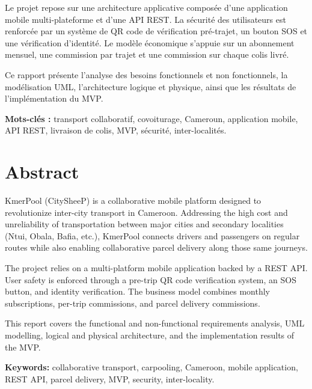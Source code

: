 \documentclass[12pt, a4paper]{report}
\begin{document}
Le projet repose sur une architecture applicative composée d'une application mobile
multi-plateforme et d'une \ac{API} \ac{REST}. La sécurité des utilisateurs est renforcée
par un système de \ac{QR} code de vérification pré-trajet, un bouton \ac{SOS} et une
vérification d'identité. Le modèle économique s'appuie sur un abonnement mensuel,
une commission par trajet et une commission sur chaque colis livré.

Ce rapport présente l'analyse des besoins fonctionnels et non fonctionnels, la
modélisation \ac{UML}, l'architecture logique et physique, ainsi que les résultats de
l'implémentation du \ac{MVP}.

\bigskip
\noindent\textbf{Mots-clés :} transport collaboratif, covoiturage, Cameroun, application mobile,
\ac{API} \ac{REST}, livraison de colis, \ac{MVP}, sécurité, inter-localités.

\chapter*{Abstract}

KmerPool (CitySheeP) is a collaborative mobile platform designed to revolutionize
inter-city transport in Cameroon. Addressing the high cost and unreliability of
transportation between major cities and secondary localities (Ntui, Obala, Bafia, etc.),
KmerPool connects drivers and passengers on regular routes while also enabling
collaborative parcel delivery along those same journeys.

The project relies on a multi-platform mobile application backed by a REST API.
User safety is enforced through a pre-trip QR code verification system, an SOS button,
and identity verification. The business model combines monthly subscriptions,
per-trip commissions, and parcel delivery commissions.

This report covers the functional and non-functional requirements analysis, UML
modelling, logical and physical architecture, and the implementation results of the MVP.

\bigskip
\noindent\textbf{Keywords:} collaborative transport, carpooling, Cameroon, mobile application,
REST API, parcel delivery, MVP, security, inter-locality.

\listoffigures
{}

\listoftables
{}
\end{document}
